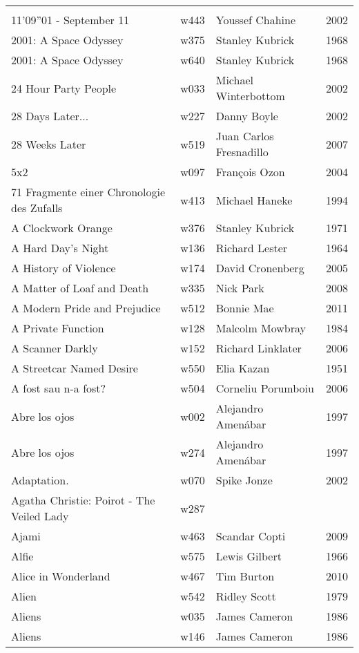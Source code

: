 \documentclass{article}
\begin{document}
\begin {center}
\begin{longtable}{p{10cm} l l l}
\hline
\\
11'09''01 - September 11 & w443 & Youssef Chahine & 2002 \\
2001: A Space Odyssey & w375 & Stanley Kubrick & 1968 \\
2001: A Space Odyssey & w640 & Stanley Kubrick & 1968 \\
24 Hour Party People & w033 & Michael Winterbottom & 2002 \\
28 Days Later... & w227 & Danny Boyle & 2002 \\
28 Weeks Later & w519 & Juan Carlos Fresnadillo & 2007 \\
5x2 & w097 & François Ozon & 2004 \\
71 Fragmente einer Chronologie des Zufalls & w413 & Michael Haneke & 1994 \\
A Clockwork Orange & w376 & Stanley Kubrick & 1971 \\
A Hard Day's Night & w136 & Richard Lester & 1964 \\
A History of Violence & w174 & David Cronenberg & 2005 \\
A Matter of Loaf and Death & w335 & Nick Park & 2008 \\
A Modern Pride and Prejudice & w512 & Bonnie Mae & 2011 \\
A Private Function & w128 & Malcolm Mowbray & 1984 \\
A Scanner Darkly & w152 & Richard Linklater & 2006 \\
A Streetcar Named Desire & w550 & Elia Kazan & 1951 \\
A fost sau n-a fost? & w504 & Corneliu Porumboiu & 2006 \\
Abre los ojos & w002 & Alejandro Amenábar & 1997 \\
Abre los ojos & w274 & Alejandro Amenábar & 1997 \\
Adaptation. & w070 & Spike Jonze & 2002 \\
Agatha Christie: Poirot - The Veiled Lady & w287 &  &  \\
Ajami & w463 & Scandar Copti & 2009 \\
Alfie & w575 & Lewis Gilbert & 1966 \\
Alice in Wonderland & w467 & Tim Burton & 2010 \\
Alien & w542 & Ridley Scott & 1979 \\
Aliens & w035 & James Cameron & 1986 \\
Aliens & w146 & James Cameron & 1986 \\

\end{longtable}
\end{center}
\end{document}
